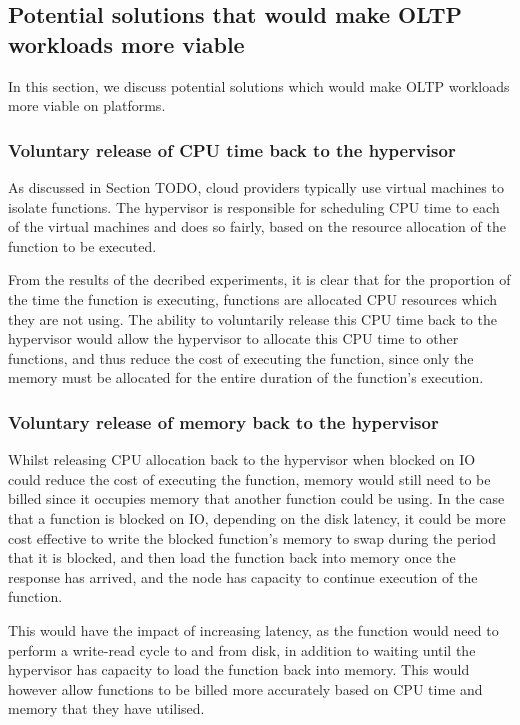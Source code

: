 \subsection{Potential solutions that would make OLTP workloads more viable}
In this section, we discuss potential solutions which would make OLTP workloads more viable on \faas{} platforms.

\subsubsection{Voluntary release of CPU time back to the hypervisor}
As discussed in Section TODO, cloud providers typically use virtual machines to isolate functions. The hypervisor is responsible for scheduling CPU time to each of the virtual machines and does so fairly, based on the resource allocation of the function to be executed.

From the results of the decribed experiments, it is clear that for the proportion of the time the function is executing, functions are allocated CPU resources which they are not using. The ability to voluntarily release this CPU time back to the hypervisor would allow the hypervisor to allocate this CPU time to other functions, and thus reduce the cost of executing the function, since only the memory must be allocated for the entire duration of the function's execution.

\subsubsection{Voluntary release of memory back to the hypervisor}
Whilst releasing CPU allocation back to the hypervisor when blocked on IO could reduce the cost of executing the function, memory would still need to be billed since it occupies memory that another function could be using. In the case that a function is blocked on IO, depending on the disk latency, it could be more cost effective to write the blocked function's memory to swap during the period that it is blocked, and then load the function back into memory once the response has arrived, and the node has capacity to continue execution of the function.

This would have the impact of increasing latency, as the function would need to perform a write-read cycle to and from disk, in addition to waiting until the hypervisor has capacity to load the function back into memory. This would however allow functions to be billed more accurately based on CPU time and memory that they have utilised.

